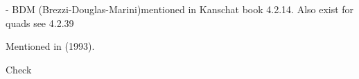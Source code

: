 
- BDM (Brezzi-Douglas-Marini)mentioned in Kanschat book 4.2.14. 
Also exist for quads see 4.2.39

Mentioned in \textcite{chen93a} (1993).

Check \textcite{brfo}
